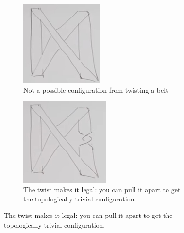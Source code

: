\documentclass[]{article}
\begin{document}
\begin{figure}[H]
\begin{subfigure}[t]{0.5\textwidth}
	\end{subfigure}
	\begin{subfigure}[t]{0.24\textwidth}
		\caption{Not a possible configuration from twisting a belt}
		\includegraphics[width=\textwidth]{aqm-5-belt-illegal}
	\end{subfigure}
	\begin{subfigure}[t]{0.24\textwidth}
		\caption{The twist makes it legal: you can pull it apart to get the topologically trivial configuration.}
		\includegraphics[width=\textwidth]{aqm-5-belt-legal}

\end{subfigure}
\end{figure}
\end{document}
